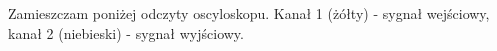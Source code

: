 \documentclass[14pt, table]{extarticle}
\begin{document}
\newpage
Zamieszczam poniżej odczyty oscyloskopu. Kanał 1 (żółty) - sygnał wejściowy, kanał 2 (niebieski) - sygnał wyjściowy.

\begin{figure}[H]
    \centering
    \qquad
\end{figure}

\begin{figure}[H]
    \centering
    \qquad
\end{figure}
\end{document}
